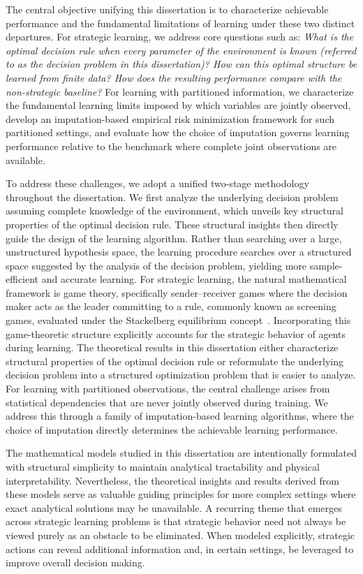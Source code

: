 The central objective unifying this dissertation is to characterize achievable performance and the fundamental limitations of learning under these two distinct departures. For strategic learning, we address core questions such as: \emph{What is the optimal decision rule when every parameter of the environment is known (referred to as the decision problem in this dissertation)? How can this optimal structure be learned from finite data? How does the resulting performance compare with the non-strategic baseline?} For learning with partitioned information, we characterize the fundamental learning limits imposed by which variables are jointly observed, develop an imputation-based empirical risk minimization framework for such partitioned settings, and evaluate how the choice of imputation governs learning performance relative to the benchmark where complete joint observations are available.

To address these challenges, we adopt a unified two-stage methodology throughout the dissertation. We first analyze the underlying decision problem assuming complete knowledge of the environment, which unveils key structural properties of the optimal decision rule. These structural insights then directly guide the design of the learning algorithm. Rather than searching over a large, unstructured hypothesis space, the learning procedure searches over a structured space suggested by the analysis of the decision problem, yielding more sample-efficient and accurate learning. For strategic learning, the natural mathematical framework is game theory, specifically sender--receiver games where the decision maker acts as the leader committing to a rule, commonly known as screening games, evaluated under the Stackelberg equilibrium concept~\cite{bruckner2011stackelberg,hardt2016strategic}. Incorporating this game-theoretic structure explicitly accounts for the strategic behavior of agents during learning. The theoretical results in this dissertation either characterize structural properties of the optimal decision rule or reformulate the underlying decision problem into a structured optimization problem that is easier to analyze. For learning with partitioned observations, the central challenge arises from statistical dependencies that are never jointly observed during training. We address this through a family of imputation-based learning algorithms, where the choice of imputation directly determines the achievable learning performance.

The mathematical models studied in this dissertation are intentionally formulated with structural simplicity to maintain analytical tractability and physical interpretability. Nevertheless, the theoretical insights and results derived from these models serve as valuable guiding principles for more complex settings where exact analytical solutions may be unavailable. A recurring theme that emerges across strategic learning problems is that strategic behavior need not always be viewed purely as an obstacle to be eliminated. When modeled explicitly, strategic actions can reveal additional information and, in certain settings, be leveraged to improve overall decision making.

